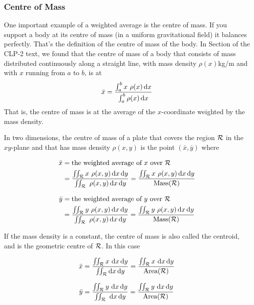 \subsubsection{Centre of Mass} 

One important example of a weighted average is the centre of mass.
If you support a body at its centre of mass (in a uniform gravitational
field) it balances perfectly. That's the definition of the centre of mass
of the body. In Section  of the CLP-2 text, we found
that the centre of mass of a body that consists of mass distributed 
continuously along a straight line, with mass density $\rho(x)$kg/m and 
with $x$ running from $a$ to $b$, is at
\begin{equation*}
\bar x = \frac{\int_a^b x\ \rho(x)\,\dee{x}}{\int_a^b \rho(x)\,\dee{x}}
\end{equation*}
That is, the centre of mass is at the average of the $x$-coordinate
weighted by the mass density.

In two dimensions, the centre of mass of a plate that covers the 
region $\mathcal{R}$ in the $xy$-plane and that has mass density $\rho(x,y)$ 
is the point  $(\bar x, \bar y)$ where
\begin{impeqn}\label{eq cofm}
\begin{align*}
\bar x & = \text{the weighted average of $x$ over $\mathcal{R}$} \\
       &=\frac{\iint_{\mathcal{R}} x\ \rho(x,y)\, \mathrm{d}x\,\mathrm{d}y}
                      {\iint_{\mathcal{R}} \ \rho(x,y)\, \mathrm{d}x\,\mathrm{d}y}
        =\frac{\iint_{\mathcal{R}} x\ \rho(x,y)\, \mathrm{d}x\,\mathrm{d}y}
                            {\text{Mass}(\mathcal{R})} \\[0.1in]
\bar y & = \text{the weighted average of $y$ over $\mathcal{R}$} \\
       &=\frac{\iint_{\mathcal{R}} y\ \rho(x,y)\, \mathrm{d}x\,\mathrm{d}y}
                     {\iint_{\mathcal{R}} \ \rho(x,y)\, \mathrm{d}x\,\mathrm{d}y}
        =\frac{\iint_{\mathcal{R}} y\ \rho(x,y)\, \mathrm{d}x\,\mathrm{d}y}
                        {\text{Mass}(\mathcal{R})} 
\end{align*}
\end{impeqn}
If the mass density is a constant, the centre of mass is also
called the centroid, and is the geometric centre of $\mathcal{R}$.
In this case
\begin{impeqn}[Centroid]\label{eq centroid}
\begin{align*}
\bar x &=\frac{\iint_{\mathcal{R}} x\ \mathrm{d}x\,\mathrm{d}y}
                      {\iint_{\mathcal{R}}  \mathrm{d}x\,\mathrm{d}y}
        =\frac{\iint_{\mathcal{R}} x\ \mathrm{d}x\,\mathrm{d}y}
                            {\text{Area}(\mathcal{R})} \\[0.1in]
\bar y &=\frac{\iint_{\mathcal{R}} y\ \mathrm{d}x\,\mathrm{d}y}
                     {\iint_{\mathcal{R}} \  \mathrm{d}x\,\mathrm{d}y}
        =\frac{\iint_{\mathcal{R}} y\  \mathrm{d}x\,\mathrm{d}y}
                        {\text{Area}(\mathcal{R})} 
\end{align*}
\end{impeqn}

